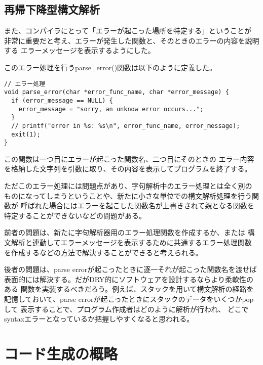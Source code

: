 \documentclass[11pt,a4j]{jarticle}
\begin{document}
\subsection{再帰下降型構文解析}


また、コンパイラにとって「エラーが起こった場所を特定する」ということが
非常に重要だと考え、エラーが発生した関数と、そのときのエラーの内容を説明する
エラーメッセージを表示するようにした。

このエラー処理を行うparse\_error()関数は以下のように定義した。

\begin{verbatim}
// エラー処理
void parse_error(char *error_func_name, char *error_message) {
  if (error_message == NULL) {
    error_message = "sorry, an unknow error occurs...";
  }
  // printf("error in %s: %s\n", error_func_name, error_message);
  exit(1);
}
\end{verbatim}

この関数は一つ目にエラーが起こった関数名、二つ目にそのときの
エラー内容を格納した文字列を引数に取り、その内容を表示してプログラムを終了する。

ただこのエラー処理には問題点があり、字句解析中のエラー処理とは全く別の
ものになってしまうということや、新たに小さな単位での構文解析処理を行う関数が
呼ばれた場合にはエラーを起こした関数名が上書きされて親となる関数を
特定することができないなどの問題がある。

\vspace{0.2in}

前者の問題は、新たに字句解析器用のエラー処理関数を作成するか、または
構文解析と連動してエラーメッセージを表示するために共通するエラー処理関数
を作成するなどの方法で解決することができると考えられる。

\vspace{0.2in}

後者の問題は、parse errorが起こったときに逐一それが起こった関数名を渡せば
表面的には解決する。だがDRY的にソフトウェアを設計するならより柔軟性のある
関数を実装するべきだろう。例えば、スタックを用いて構文解析の経路を
記憶しておいて、parse errorが起こったときにスタックのデータをいくつかpopして
表示することで、プログラム作成者はどのように解析が行われ、
どこでsyntaxエラーとなっているか把握しやすくなると思われる。




\section{コード生成の概略}
\end{document}
